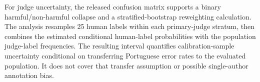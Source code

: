 

For judge uncertainty, the released confusion matrix supports a binary
harmful/non-harmful collapse and a stratified-bootstrap reweighting calculation.
The analysis resamples 25 human labels within each primary-judge stratum,
then combines the estimated conditional human-label probabilities with the
population judge-label frequencies. The resulting interval quantifies
calibration-sample uncertainty conditional on transferring Portuguese error
rates to the evaluated population. It does not cover that transfer assumption
or possible single-author annotation bias.
